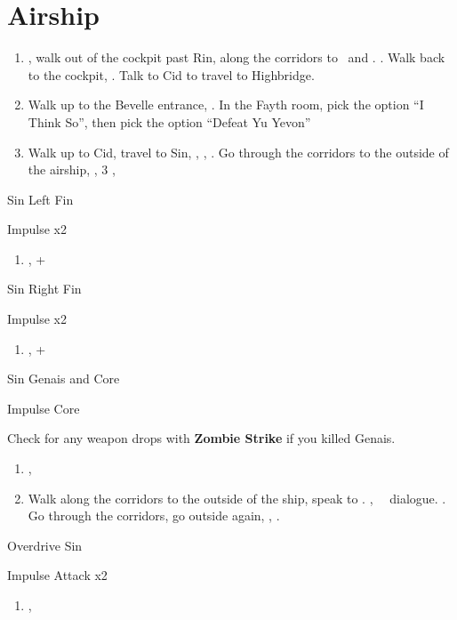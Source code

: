 \chapter{Airship}
\begin{enumerate}
	\item \sd, walk out of the cockpit past Rin, along the corridors to \yuna\ and \kimahri. \sd. Walk back to the cockpit, \sd. Talk to Cid to travel to Highbridge.
	\item Walk up to the Bevelle entrance, \sd. In the Fayth room, pick the  option ``I Think So'', then pick the  option ``Defeat Yu Yevon''
	\item Walk up to Cid, travel to Sin, \sd, \skippablefmv, \sd. Go through the corridors to the outside of the airship, \sd, 3 \skippablefmv[2:10], \sd
\end{enumerate}
\begin{battle}[65000]{Sin Left Fin}
	\begin{itemize}
		\summon{\bahamut}
		\bahamutf Impulse x2
	\end{itemize}
\end{battle}
\begin{enumerate}[resume]
	\item \sd, \cs+\skippablefmv
\end{enumerate}
\begin{battle}[65000]{Sin Right Fin}
	\begin{itemize}
		\summon{\bahamut}
		\bahamutf Impulse x2
	\end{itemize}
\end{battle}
\begin{enumerate}[resume]
	\item \sd, \cs+\skippablefmv
\end{enumerate}
\begin{battle}[56000]{Sin Genais and Core}
	\begin{itemize}
		\summon{\bahamut}
		\bahamutf Impulse Core
	\end{itemize}
	Check for any weapon drops with \textbf{Zombie Strike} if you killed Genais.
\end{battle}
\begin{enumerate}[resume]
	\item \sd, \skippablefmv
	\item Walk along the corridors to the outside of the ship, speak to \yuna. \cs[1:40], \sd\ \rikku\ dialogue. \skippablefmv. Go through the corridors, go outside again, \skippablefmv, \sd.
\end{enumerate}
\begin{battle}[140000]{Overdrive Sin}
	\begin{itemize}
		\summon{\bahamut}
		\bahamutf Impulse
		\bahamutf Attack x2
	\end{itemize}
\end{battle}
\begin{enumerate}[resume]
	\item \skippablefmv[1:20], \sd
\end{enumerate}